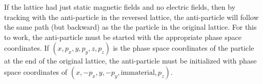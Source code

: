 If the  lattice had just static magnetic fields and no electric fields, then
by tracking with the anti-particle in the reversed lattice, the anti-particle will follow the same
path (but backward) as the the particle in the original lattice. For this to work, the anti-particle
must be started with the appropriate phase space coordinates. If $(x, p_x, y, p_y, z, p_z)$ is
the phase space coordinates of the particle at the end of the original lattice, the anti-particle
must be initialized with phase space coordinates of $(x, -p_x, y, -p_y, \text{immaterial}, p_z)$.

